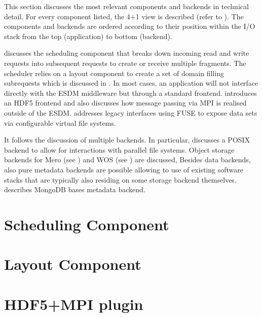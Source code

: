 
\begin{chapterIntro}
	This section discusses the most relevant components and backends in technical detail.
	For every component listed, the 4+1 view is described (refer to ).
	The components and backends are ordered according to their position within the I/O stack from the top (application) to bottom (backend).

	 discusses the scheduling component that breaks down incoming read and write requests into subsequent requests to create or receive multiple fragments.
	The scheduler relies on a layout component to create a set of domain filling subrequests which is discussed in .
	In most cases, an application will not interface directly with the ESDM middleware but through a standard frontend.
	 introduces an HDF5 frontend and also discusses how message passing via MPI is realised outside of the ESDM.
	 addresses legacy interfaces using FUSE to expose data sets via configurable virtual file systems.

	It follows the discussion of multiple backends.
	In particular,  discusses a POSIX backend to allow for interactions with parallel file systems.
	Object storage backends for Mero (see ) and WOS (see ) are discussed,
	Besides data backends, also pure metadata backends are possible allowing to use of existing software stacks that are typically also residing on some storage backend themselves.
	 describes MongoDB bases metadata backend.
\end{chapterIntro}



\section{Scheduling Component}
\label{component: scheduler}


\clearpage
\section{Layout Component}
\label{component: layout}




\clearpage
\section{HDF5+MPI plugin}
\label{frontend: hdf5 + mpi}



